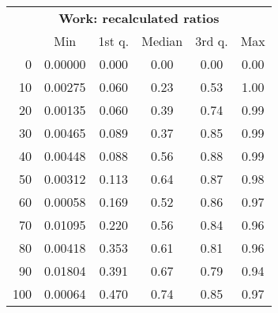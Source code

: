 \begin{tabular}{r|ccccc}
  \multicolumn{6}{c}{{\bf Work: recalculated ratios}} \\
  & Min & 1st q. & Median & 3rd q. & Max \\ \hline\hline
  0 & 0.00000 & 0.000 & 0.00 & 0.00 & 0.00
\\ 10 & 0.00275 & 0.060 & 0.23 & 0.53 & 1.00
\\ 20 & 0.00135 & 0.060 & 0.39 & 0.74 & 0.99
\\ 30 & 0.00465 & 0.089 & 0.37 & 0.85 & 0.99
\\ 40 & 0.00448 & 0.088 & 0.56 & 0.88 & 0.99
\\ 50 & 0.00312 & 0.113 & 0.64 & 0.87 & 0.98
\\ 60 & 0.00058 & 0.169 & 0.52 & 0.86 & 0.97
\\ 70 & 0.01095 & 0.220 & 0.56 & 0.84 & 0.96
\\ 80 & 0.00418 & 0.353 & 0.61 & 0.81 & 0.96
\\ 90 & 0.01804 & 0.391 & 0.67 & 0.79 & 0.94
\\ 100 & 0.00064 & 0.470 & 0.74 & 0.85 & 0.97
\end{tabular}
